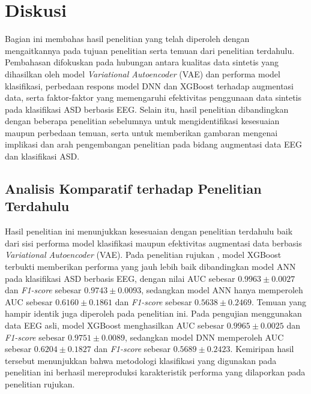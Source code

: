 


\section{Diskusi}

Bagian ini membahas hasil penelitian yang telah diperoleh dengan mengaitkannya pada tujuan penelitian serta temuan dari penelitian terdahulu. Pembahasan difokuskan pada hubungan antara kualitas data sintetis yang dihasilkan oleh model \textit{Variational Autoencoder} (VAE) dan performa model klasifikasi, perbedaan respons model DNN dan XGBoost terhadap augmentasi data, serta faktor-faktor yang memengaruhi efektivitas penggunaan data sintetis pada klasifikasi ASD berbasis EEG. Selain itu, hasil penelitian dibandingkan dengan beberapa penelitian sebelumnya untuk mengidentifikasi kesesuaian maupun perbedaan temuan, serta untuk memberikan gambaran mengenai implikasi dan arah pengembangan penelitian pada bidang augmentasi data EEG dan klasifikasi ASD.

\subsection{Analisis Komparatif terhadap Penelitian Terdahulu}

Hasil penelitian ini menunjukkan kesesuaian dengan penelitian terdahulu baik dari sisi performa model klasifikasi maupun efektivitas augmentasi data berbasis \textit{Variational Autoencoder} (VAE). Pada penelitian rujukan \cite{paper_ref}, model XGBoost terbukti memberikan performa yang jauh lebih baik dibandingkan model ANN pada klasifikasi ASD berbasis EEG, dengan nilai AUC sebesar $0.9963 \pm 0.0027$ dan \textit{F1-score} sebesar $0.9743 \pm 0.0093$, sedangkan model ANN hanya memperoleh AUC sebesar $0.6160 \pm 0.1861$ dan \textit{F1-score} sebesar $0.5638 \pm 0.2469$. Temuan yang hampir identik juga diperoleh pada penelitian ini. Pada pengujian menggunakan data EEG asli, model XGBoost menghasilkan AUC sebesar $0.9965 \pm 0.0025$ dan \textit{F1-score} sebesar $0.9751 \pm 0.0089$, sedangkan model DNN memperoleh AUC sebesar $0.6204 \pm 0.1827$ dan \textit{F1-score} sebesar $0.5689 \pm 0.2423$. Kemiripan hasil tersebut menunjukkan bahwa metodologi klasifikasi yang digunakan pada penelitian ini berhasil mereproduksi karakteristik performa yang dilaporkan pada penelitian rujukan.

